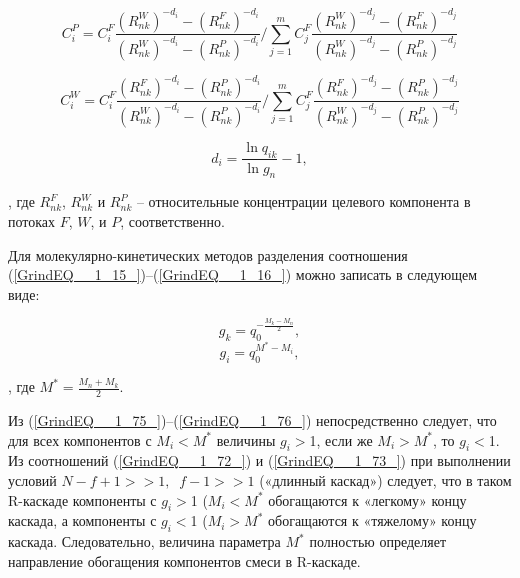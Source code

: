 \begin{equation} \label{GrindEQ__1_72_} 
  C_{i}^{P}=C_{i}^{F} \frac{\left(R_{n k}^{W}\right)^{-d_{i}}-\left(R_{n k}^{F}\right)^{-d_{i}}}{\left(R_{n k}^{W}\right)^{-d_{i}}-\left(R_{n k}^{P}\right)^{-d_{i}}} / \sum_{j=1}^{m} C_{j}^{F} \frac{\left(R_{n k}^{W}\right)^{-d_{j}}-\left(R_{n k}^{F}\right)^{-d_{j}}}{\left(R_{n k}^{W}\right)^{-d_{j}}-\left(R_{n k}^{P}\right)^{-d_{j}}}
\end{equation} 

\begin{equation} \label{GrindEQ__1_73_} 
  C_{i}^{W}=C_{i}^{F} \frac{\left(R_{n k}^{F}\right)^{-d_{i}}-\left(R_{n k}^{P}\right)^{-d_{i}}}{\left(R_{n k}^{W}\right)^{-d_{i}}-\left(R_{n k}^{P}\right)^{-d_{i}}} / \sum_{j=1}^{m} C_{j}^{F} \frac{\left(R_{n k}^{F}\right)^{-d_{j}}-\left(R_{n k}^{P}\right)^{-d_{j}}}{\left(R_{n k}^{W}\right)^{-d_{j}}-\left(R_{n k}^{P}\right)^{-d_{j}}}
\end{equation} 

\begin{equation} \label{GrindEQ__1_74_} 
  d_{i} =\frac{\ln q_{ik} }{\ln g_{n} } -1,              
\end{equation}

, где $R_{n k}^{F}$, $R_{n k}^{W}$ и $R_{n k}^{P}$ -- относительные концентрации целевого компонента в потоках $F$, $W$, и $P$, соответственно.

Для молекулярно-кинетических методов разделения соотношения (\ref{GrindEQ__1_15_})--(\ref{GrindEQ__1_16_}) можно записать в следующем виде:

\begin{equation} \label{GrindEQ__1_75_} 
  g_{k} =q_{0}^{-\frac{M_{k} -M_{n} }{2} } ,        
  \end{equation} 
  \begin{equation} \label{GrindEQ__1_76_} 
  g_{i} =q_{0}^{M^{*} -M_{i} } ,        
\end{equation} 

, где $M^{*} =\frac{M_{n} +M_{k} }{2} $.

Из (\ref{GrindEQ__1_75_})--(\ref{GrindEQ__1_76_}) непосредственно следует, что для всех компонентов с $M_{i} $$\mathrm{<}$$M^{*} $ величины $g_{i} $$\mathrm{>}$1, если же $M_{i} $$\mathrm{>}$$M^{*} $, то $g_{i} $$\mathrm{<}$1. Из соотношений (\ref{GrindEQ__1_72_}) и (\ref{GrindEQ__1_73_}) при выполнении условий $N-f+1>>1,\; \; f-1>>1$ («длинный каскад») следует, что в таком R-каскаде компоненты с $g_{i} $$\mathrm{>}$1 ($M_{i} $$\mathrm{<}$$M^{*} $ обогащаются к «легкому» концу каскада, а компоненты с $g_{i} $$\mathrm{<}$1 ($M_{i} $$\mathrm{>}$$M^{*}$ обогащаются к «тяжелому» концу каскада. Следовательно, величина параметра $M^{*}$ полностью определяет направление обогащения компонентов смеси в R-каскаде. 

